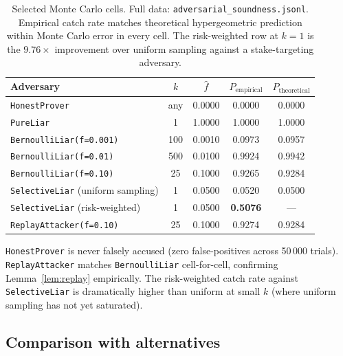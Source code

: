\documentclass[10pt]{article}
\begin{document}
\begin{table}[h]
\centering
\small
\begin{tabular}{lcccc}
\toprule
Adversary & $k$ & $\hat f$ & $P_{\text{empirical}}$ & $P_{\text{theoretical}}$ \\
\midrule
\texttt{HonestProver} & any & 0.0000 & 0.0000 & 0.0000 \\
\texttt{PureLiar} & 1 & 1.0000 & 1.0000 & 1.0000 \\
\texttt{BernoulliLiar(f=0.001)} & 100 & 0.0010 & 0.0973 & 0.0957 \\
\texttt{BernoulliLiar(f=0.01)} & 500 & 0.0100 & 0.9924 & 0.9942 \\
\texttt{BernoulliLiar(f=0.10)} & 25 & 0.1000 & 0.9265 & 0.9284 \\
\texttt{SelectiveLiar} (uniform sampling) & 1 & 0.0500 & 0.0520 & 0.0500 \\
\texttt{SelectiveLiar} (risk-weighted) & 1 & 0.0500 & \textbf{0.5076} & --- \\
\texttt{ReplayAttacker(f=0.10)} & 25 & 0.1000 & 0.9274 & 0.9284 \\
\bottomrule
\end{tabular}
\caption{Selected Monte Carlo cells. Full data: \texttt{adversarial\_soundness.jsonl}. Empirical catch rate matches theoretical hypergeometric prediction within Monte Carlo error in every cell. The risk-weighted row at $k=1$ is the $9.76\times$ improvement over uniform sampling against a stake-targeting adversary.}
\end{table}

\texttt{HonestProver} is never falsely accused (zero false-positives across 50\,000 trials). \texttt{ReplayAttacker} matches \texttt{BernoulliLiar} cell-for-cell, confirming Lemma~\ref{lem:replay} empirically. The risk-weighted catch rate against \texttt{SelectiveLiar} is dramatically higher than uniform at small $k$ (where uniform sampling has not yet saturated).

\subsection{Comparison with alternatives}
\end{document}
